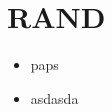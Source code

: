 \chapter{\uppercase{rand}}
\label{ch:rand}
\setcounter{page}{1}

\lipsum

\cite{Peiris1970,Massoudi2001}


\begin{itemize}
	\item paps
	\item asdasda
\end{itemize}